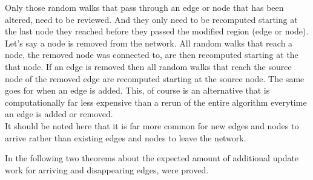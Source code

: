 \documentclass[sigconf]{acmart}
\theoremstyle{definition}
\begin{document}
\begin{itemize}
Only those random walks that pass through an edge or node that has been altered, need to be reviewed. And they only need to be recomputed starting at the last node they reached before they passed the modified region (edge or node). Let's say a node is removed from the network. All random walks that reach a node, the removed node was connected to, are then recomputed starting at the that node. If an edge is removed then all random walks that reach the source node of the removed edge are recomputed starting at the source node. The same goes for when an edge is added. This, of course is an alternative that is computationally far less expensive than a rerun of the entire algorithm everytime an edge is added or removed. \vspace{1em}\\
It should be noted here that it is far more common for new edges and nodes to arrive rather than existing edges and nodes to leave the network.\vspace{1em}\\
\end{itemize}
In \citep{Fast incremental and personalized pagerank} the following two theorems about the expected amount of additional update work for arriving and disappearing edges, were proved.
\end{document}
